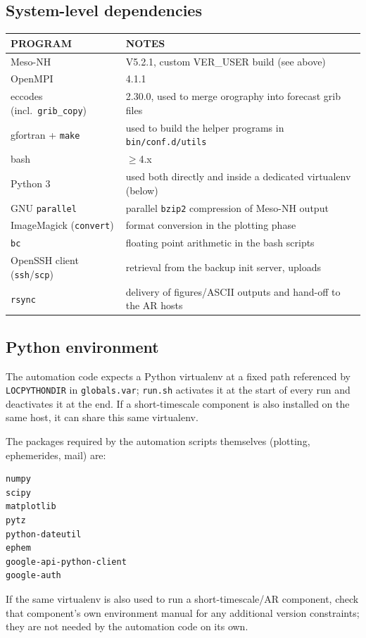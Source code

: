 \subsection{System-level dependencies}
\begin{table}[H]
\centering
\begin{tabular}{|l|l|}
\hline
\textbf{PROGRAM} & \textbf{NOTES} \\ \hline
Meso-NH & V5.2.1, custom VER\_USER build (see above) \\
OpenMPI & 4.1.1 \\
eccodes (incl.\ \texttt{grib\_copy}) & 2.30.0, used to merge orography into forecast grib files \\
gfortran + \texttt{make} & used to build the helper programs in \texttt{bin/conf.d/utils} \\
bash & \(\geq\)4.x \\
Python 3 & used both directly and inside a dedicated virtualenv (below) \\
GNU \texttt{parallel} & parallel \texttt{bzip2} compression of Meso-NH output \\
ImageMagick (\texttt{convert}) & format conversion in the plotting phase \\
\texttt{bc} & floating point arithmetic in the bash scripts \\
OpenSSH client (\texttt{ssh}\slash\texttt{scp}) & retrieval from the backup init server, uploads \\
\texttt{rsync} & delivery of figures/ASCII outputs and hand-off to the AR hosts \\
\hline
\end{tabular}
\end{table}

\subsection{Python environment}
The automation code expects a Python virtualenv at a fixed path referenced by \texttt{LOCPYTHONDIR} in
\texttt{globals.var}; \texttt{run.sh} activates it at the start of every run and deactivates it at the
end. If a short-timescale component is also installed on the same host, it can share this same
virtualenv.

The packages required by the automation scripts themselves (plotting, ephemerides, mail) are:
\begin{lstlisting}
numpy
scipy
matplotlib
pytz
python-dateutil
ephem
google-api-python-client
google-auth
\end{lstlisting}
If the same virtualenv is also used to run a short-timescale/AR component, check that component's own
environment manual for any additional version constraints; they are not needed by the automation code
on its own.

